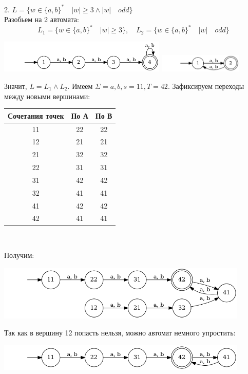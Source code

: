 \documentclass{article}
\begin{document}
    2. $L = \{w \in \{a, b\}^* \quad |w| \geq 3 \wedge |w|\quad odd\}$\\
    Разобьем на 2 автомата:
    $$L_1 = \{w \in \{a, b\}^* \quad |w| \geq 3\}, \quad L_2 = \{w \in \{a, b\}^* \quad |w|\quad odd\}$$
    \begin{center}
        \includegraphics[width=0.6\textwidth]{pic9.dot}
        \includegraphics[width=0.3\textwidth]{pic10.dot}
    \end{center}
    Значит, $L = L_1 \wedge L_2$. Имеем $\Sigma = {a, b}, s = 11, T = 42$. Зафиксируем переходы между новыми вершинами:
    \begin{center}
        \begin{tabular}{|c|c|c|}
            \hline
            Сочетания точек & По А & По В \\
            \hline
            11 & 22 & 22\\
            12 & 21 & 21\\
            21 & 32 & 32\\
            22 & 31 & 31\\
            31 & 42 & 42\\
            32 & 41 & 41\\
            41 & 42 & 42\\
            42 & 41 & 41\\
            \hline
        \end{tabular}\\
    \end{center}
    Получим:
    \begin{center}
        \includegraphics[width=0.9\textwidth]{pic11.dot}\\
    \end{center}
    Так как в вершину 12 попасть нельзя, можно автомат немного упростить:
    \begin{center}
        \includegraphics[width=0.9\textwidth]{pic12.dot}\\
    \end{center}
    
\end{document}
